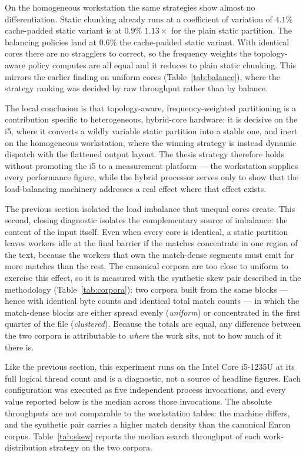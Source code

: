On the homogeneous workstation the same strategies show almost no differentiation.
Static chunking already runs at a coefficient of variation of $4.1\%$
cache-padded static variant is at $0.9\%$
$1.13\times$ for the plain static partition. The balancing policies land at
$0.6\%$
the cache-padded static variant. With identical
cores there are no stragglers to correct, so the frequency weights the
topology-aware policy computes are all equal and it reduces to plain static
chunking. This mirrors the earlier finding on uniform cores
(Table~\ref{tab:balance}), where the strategy ranking was decided by raw throughput
rather than by balance.

The local conclusion is that topology-aware, frequency-weighted partitioning is a
contribution specific to heterogeneous, hybrid-core hardware: it is decisive on the
i5, where it converts a wildly variable static partition into a stable one, and
inert on the homogeneous workstation, where the winning strategy is instead dynamic
dispatch with the flattened output layout. The thesis strategy therefore holds
without promoting the i5 to a measurement platform --- the workstation supplies every
performance figure, while the hybrid processor serves only to show that the
load-balancing machinery addresses a real effect where that effect exists.

\label{subsec:skew}

The previous section isolated the load imbalance that unequal cores create. This
second, closing diagnostic isolates the complementary source of imbalance: the
content of the input itself. Even when every core is identical, a static
partition leaves workers idle at the final barrier if the matches concentrate in
one region of the text, because the workers that own the match-dense segments
must emit far more matches than the rest. The canonical corpora are too close to
uniform to exercise this effect, so it is measured with the synthetic skew pair
described in the methodology (Table~\ref{tab:corpora}): two corpora built from
the same blocks --- hence with identical byte counts and identical total match
counts --- in which the match-dense blocks are either spread evenly
(\emph{uniform}) or concentrated in the first quarter of the file
(\emph{clustered}). Because the totals are equal, any difference between the two
corpora is attributable to \emph{where} the work sits, not to how much of it
there is.

Like the previous section, this experiment runs on the Intel Core i5-1235U at
its full logical thread count and is a diagnostic, not a source of headline
figures. Each configuration was executed as five independent process
invocations, and every value reported below is the median across those
invocations. The absolute throughputs are not comparable to the workstation
tables: the machine differs, and the synthetic pair carries a higher match
density than the canonical Enron corpus. Table~\ref{tab:skew} reports the
median search throughput of each work-distribution strategy on the two corpora.

